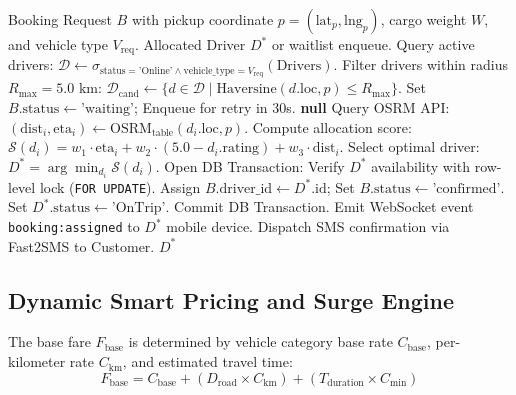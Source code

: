 \documentclass[conference]{IEEEtran}
\begin{document}
\begin{algorithm}[htbp]
\caption{Intelligent Driver Allocation \& OSRM Route Optimization}
\label{alg:dispatch}
\begin{algorithmic}[1]
\REQUIRE Booking Request $B$ with pickup coordinate $p = (\text{lat}_p, \text{lng}_p)$, cargo weight $W$, and vehicle type $V_{\text{req}}$.
\ENSURE Allocated Driver $D^*$ or waitlist enqueue.
\STATE Query active drivers: $\mathcal{D} \leftarrow \sigma_{\text{status} = \text{'Online'} \land \text{vehicle\_type} = V_{\text{req}}}(\text{Drivers})$.
\STATE Filter drivers within radius $R_{\max} = 5.0\text{ km}$:
\STATE $\mathcal{D}_{\text{cand}} \leftarrow \{d \in \mathcal{D} \mid \text{Haversine}(d.\text{loc}, p) \le R_{\max}\}$.
    \STATE Set $B.\text{status} \leftarrow \text{'waiting'}$; Enqueue for retry in 30s.
    \RETURN \textbf{null}
\ENDIF
{}
    \STATE Query OSRM API: $(\text{dist}_i, \text{eta}_i) \leftarrow \text{OSRM}_{\text{table}}(d_i.\text{loc}, p)$.
    \STATE Compute allocation score:
    \STATE $\mathcal{S}(d_i) = w_1 \cdot \text{eta}_i + w_2 \cdot (5.0 - d_i.\text{rating}) + w_3 \cdot \text{dist}_i$.
\ENDFOR
\STATE Select optimal driver: $D^* = \arg\min_{d_i} \mathcal{S}(d_i)$.
\STATE Open DB Transaction:
\STATE Verify $D^*$ availability with row-level lock (\texttt{FOR UPDATE}).
\STATE Assign $B.\text{driver\_id} \leftarrow D^*.\text{id}$; Set $B.\text{status} \leftarrow \text{'confirmed'}$.
\STATE Set $D^*.\text{status} \leftarrow \text{'OnTrip'}$.
\STATE Commit DB Transaction.
\STATE Emit WebSocket event \texttt{booking:assigned} to $D^*$ mobile device.
\STATE Dispatch SMS confirmation via Fast2SMS to Customer.
\RETURN $D^*$
\end{algorithmic}
\end{algorithm}

\subsection{Dynamic Smart Pricing and Surge Engine}
The base fare $F_{\text{base}}$ is determined by vehicle category base rate $C_{\text{base}}$, per-kilometer rate $C_{\text{km}}$, and estimated travel time:
\begin{equation}
    F_{\text{base}} = C_{\text{base}} + \left(D_{\text{road}} \times C_{\text{km}}\right) + \left(T_{\text{duration}} \times C_{\text{min}}\right)
\end{equation}
\end{document}
